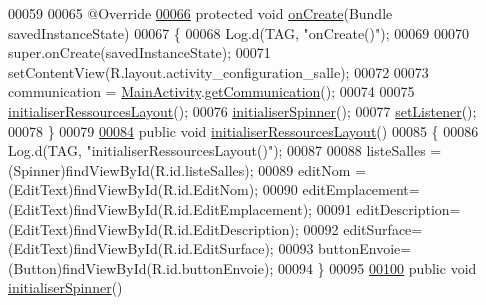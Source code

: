 \begin{DoxyCode}
00059 
00065     @Override
\hyperlink{classcom_1_1lasalle_1_1meeting_1_1_configuration_salle_activity_a202931e45bdc0f81c3f0518a6b28e712}{00066}     \textcolor{keyword}{protected} \textcolor{keywordtype}{void} \hyperlink{classcom_1_1lasalle_1_1meeting_1_1_configuration_salle_activity_a202931e45bdc0f81c3f0518a6b28e712}{onCreate}(Bundle savedInstanceState)
00067     \{
00068         Log.d(TAG, \textcolor{stringliteral}{"onCreate()"});
00069 
00070         super.onCreate(savedInstanceState);
00071         setContentView(R.layout.activity\_configuration\_salle);
00072 
00073         communication = \hyperlink{classcom_1_1lasalle_1_1meeting_1_1_main_activity}{MainActivity}.\hyperlink{classcom_1_1lasalle_1_1meeting_1_1_main_activity_a625741ceb02451098c8d7e6f95fafa3a}{getCommunication}();
00074 
00075         \hyperlink{classcom_1_1lasalle_1_1meeting_1_1_configuration_salle_activity_a24314b86f87df50bb933484d1d1435ac}{initialiserRessourcesLayout}();
00076         \hyperlink{classcom_1_1lasalle_1_1meeting_1_1_configuration_salle_activity_ac0b88ac36a5ee40988f3ee8fea7c54ee}{initialiserSpinner}();
00077         \hyperlink{classcom_1_1lasalle_1_1meeting_1_1_configuration_salle_activity_a8d3eea01718b9535c88caa796d8b6377}{setListener}();
00078     \}
00079 
\hyperlink{classcom_1_1lasalle_1_1meeting_1_1_configuration_salle_activity_a24314b86f87df50bb933484d1d1435ac}{00084}     \textcolor{keyword}{public} \textcolor{keywordtype}{void} \hyperlink{classcom_1_1lasalle_1_1meeting_1_1_configuration_salle_activity_a24314b86f87df50bb933484d1d1435ac}{initialiserRessourcesLayout}()
00085     \{
00086         Log.d(TAG, \textcolor{stringliteral}{"initialiserRessourcesLayout()"});
00087 
00088         listeSalles = (Spinner)findViewById(R.id.listeSalles);
00089         editNom = (EditText)findViewById(R.id.EditNom);
00090         editEmplacement= (EditText)findViewById(R.id.EditEmplacement);
00091         editDescription= (EditText)findViewById(R.id.EditDescription);
00092         editSurface= (EditText)findViewById(R.id.EditSurface);
00093         buttonEnvoie= (Button)findViewById(R.id.buttonEnvoie);
00094     \}
00095 
\hyperlink{classcom_1_1lasalle_1_1meeting_1_1_configuration_salle_activity_ac0b88ac36a5ee40988f3ee8fea7c54ee}{00100}     \textcolor{keyword}{public} \textcolor{keywordtype}{void} \hyperlink{classcom_1_1lasalle_1_1meeting_1_1_configuration_salle_activity_ac0b88ac36a5ee40988f3ee8fea7c54ee}{initialiserSpinner}()

\end{DoxyCode}
